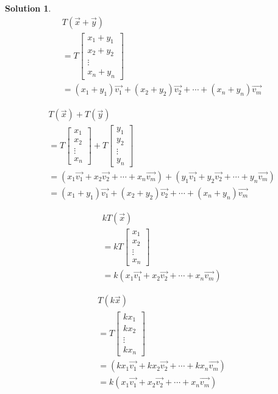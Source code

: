 \documentclass{article}
\newtheorem*{solution}{Solution}
\begin{document}
\begin{solution}
\begin{align*}
& T(\vec{x} + \vec{y}) \\
&= T \begin{bmatrix} x_{1} + y_{1} \\ x_{2} + y_{2} \\ \vdots \\ x_{n} + y_{n} \end{bmatrix} \\
&= (x_{1} + y_{1}) \vec{v_{1}} + (x_{2} + y_{2}) \vec{v_{2}} + \cdots + (x_{n} + y_{n}) \vec{v_{m}}
\end{align*}

\begin{align*}
& T(\vec{x}) + T(\vec{y}) \\
&= T \begin{bmatrix} x_{1} \\ x_{2} \\ \vdots \\ x_{n} \end{bmatrix} + T \begin{bmatrix} y_{1} \\ y_{2} \\ \vdots \\ y_{n} \end{bmatrix} \\
&= (x_{1} \vec{v_{1}} + x_{2} \vec{v_{2}} + \cdots + x_{n} \vec{v_{m}}) + (y_{1} \vec{v_{1}} + y_{2} \vec{v_{2}} + \cdots + y_{n} \vec{v_{m}}) \\
&= (x_{1} + y_{1}) \vec{v_{1}} + (x_{2} + y_{2}) \vec{v_{2}} + \cdots + (x_{n} + y_{n}) \vec{v_{m}}
\end{align*}

\begin{align*}
& kT(\vec{x}) \\
&= kT \begin{bmatrix} x_{1} \\ x_{2} \\ \vdots \\ x_{n} \end{bmatrix} \\
&= k (x_{1} \vec{v_{1}} + x_{2} \vec{v_{2}} + \cdots + x_{n} \vec{v_{m}})
\end{align*}

\begin{align*}
& T(k\vec{x}) \\
&= T \begin{bmatrix} kx_{1} \\ kx_{2} \\ \vdots \\ kx_{n} \end{bmatrix} \\
&= (kx_{1} \vec{v_{1}} + kx_{2} \vec{v_{2}} + \cdots + kx_{n} \vec{v_{m}}) \\
&= k (x_{1} \vec{v_{1}} + x_{2} \vec{v_{2}} + \cdots + x_{n} \vec{v_{m}})
\end{align*}


\end{solution}
\end{document}
